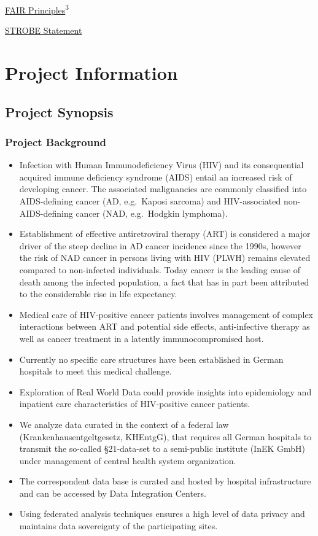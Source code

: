 \documentclass[
  letterpaper,
  DIV=11,
  numbers=noendperiod]{scrreprt}
\begin{document}
\href{https://www.go-fair.org/fair-principles/}{FAIR
Principles}\textsuperscript{3}

\href{https://www.strobe-statement.org/}{STROBE Statement}

\part{Project Information}

\hypertarget{project-synopsis}{%
\chapter{Project Synopsis}\label{project-synopsis}}

\hypertarget{section-ProjectBackground}{%
\section{Project Background}\label{section-ProjectBackground}}

\begin{itemize}
\item
  Infection with Human Immunodeficiency Virus (HIV) and its
  consequential acquired immune deficiency syndrome (AIDS) entail an
  increased risk of developing cancer. The associated malignancies are
  commonly classified into AIDS-defining cancer (AD, e.g.~Kaposi
  sarcoma) and HIV-associated non-AIDS-defining cancer (NAD,
  e.g.~Hodgkin lymphoma).
\item
  Establishment of effective antiretroviral therapy (ART) is considered
  a major driver of the steep decline in AD cancer incidence since the
  1990s, however the risk of NAD cancer in persons living with HIV
  (PLWH) remains elevated compared to non-infected individuals. Today
  cancer is the leading cause of death among the infected population, a
  fact that has in part been attributed to the considerable rise in life
  expectancy.
\item
  Medical care of HIV-positive cancer patients involves management of
  complex interactions between ART and potential side effects,
  anti-infective therapy as well as cancer treatment in a latently
  immunocompromised host.
\item
  Currently no specific care structures have been established in German
  hospitals to meet this medical challenge.
\item
  Exploration of Real World Data could provide insights into
  epidemiology and inpatient care characteristics of HIV-positive cancer
  patients.
\item
  We analyze data curated in the context of a federal law
  (Krankenhausentgeltgesetz, KHEntgG), that requires all German
  hospitals to transmit the so-called §21-data-set to a semi-public
  institute (InEK GmbH) under management of central health system
  organization.
\item
  The correspondent data base is curated and hosted by hospital
  infrastructure and can be accessed by Data Integration Centers.
\item
  Using federated analysis techniques ensures a high level of data
  privacy and maintains data sovereignty of the participating sites.
\end{itemize}
\end{document}

